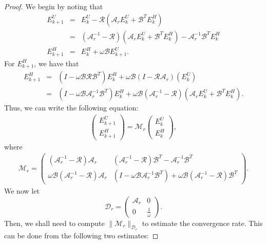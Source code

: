 \documentclass{article}
\theoremstyle{definition}
\begin{document}
\begin{proof} 
We begin by noting that  
\begin{eqnarray*}
E^U_{k+1} &=& E^U_k - \mathcal{R} (\mathcal{A}_r  E^U_k + \mathcal{B}^T E^H_k) \\
          &=& (\mathcal{A}_r^{-1} - \mathcal{R})(\mathcal{A}_r E^U_k + \mathcal{B}^T E_k^H) - \mathcal{A}_r^{-1} \mathcal{B}^T E^H_k \\
E^H_{k+1} &=& E^H_k + \omega \mathcal{B} E^U_{k+1}. 
\end{eqnarray*} 
For $E_{k+1}^H$, we have that 
\begin{eqnarray*}
E^H_{k+1} &=& (I - \omega \mathcal{B} \mathcal{R} \mathcal{B}^T) E_k^H + \omega \mathcal{B} (I - \mathcal{R} \mathcal{A}_r)(E_k^U) \\ 
&=& (I - \omega \mathcal{B} \mathcal{A}_r^{-1} \mathcal{B}^T) E_k^H + \omega \mathcal{B} (\mathcal{A}_r^{-1} - \mathcal{R})(\mathcal{A}_r E_k^U + \mathcal{B}^T E_k^H). 
\end{eqnarray*} 
Thus, we can write the following equation: 
\begin{eqnarray}
\begin{pmatrix} E^U_{k+1} \\ E^H_{k+1} \end{pmatrix} 
= \mathcal{M}_r 
\begin{pmatrix} E^U_{k} \\ E^H_{k} \end{pmatrix}, 
\end{eqnarray} 
where
\begin{eqnarray}\label{mbar} 
\mathcal{M}_r = \begin{pmatrix} 
(\mathcal{A}_r^{-1} - \mathcal{R})\mathcal{A}_r & (\mathcal{A}_r^{-1} - \mathcal{R})\mathcal{B}^T - \mathcal{A}_r^{-1} \mathcal{B}^T \\
\omega \mathcal{B} (\mathcal{A}_r^{-1} - \mathcal{R}) \mathcal{A}_r & (I - \omega \mathcal{B} \mathcal{A}_r^{-1} \mathcal{B}^T) + \omega \mathcal{B}(\mathcal{A}_r^{-1} - \mathcal{R}) \mathcal{B}^T 
\end{pmatrix}. 
\end{eqnarray}
We now let 
\begin{equation}
\mathcal{D}_r = \begin{pmatrix} 
\mathcal{A}_r & 0 \\ 
0 & \frac{1}{\omega} 
\end{pmatrix}. 
\end{equation} 
Then, we shall need to compute $
\|\mathcal{M}_r\|_{\mathcal{D}_r}$ to estimate the convergence rate. This can be done from the following two estimates: 

\end{proof}
\end{document}
